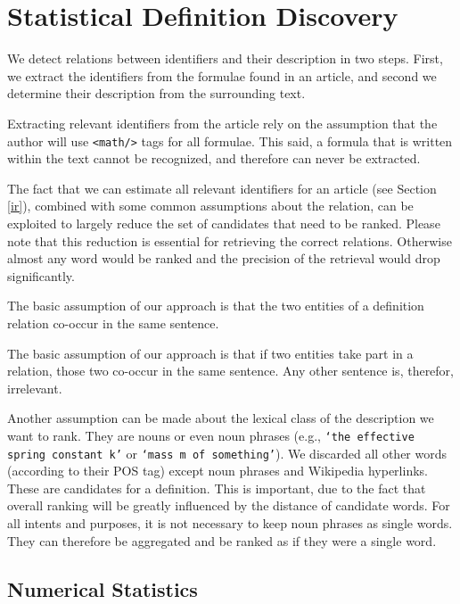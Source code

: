\documentclass[runningheads]{llncs}
\begin{document}
\section{Statistical Definition Discovery}

We detect relations between identifiers and their description in two steps.
First, we extract the identifiers from the formulae found in an article, and
second we determine their description from the surrounding text.

Extracting relevant identifiers from the article rely on the assumption that
the author will use \texttt{<math/>} tags for all formulae. This said, a
formula that is written within the text cannot be recognized, and therefore
can never be extracted.

The fact that we can estimate all relevant identifiers for an article (see
Section \ref{ir}), combined with some common assumptions about the relation,
can be exploited to largely reduce the set of candidates that need to be ranked.
Please note that this reduction is essential for retrieving the correct
relations. Otherwise almost any word would be ranked and the precision of the
retrieval would drop significantly.

The basic assumption of our approach is that the two entities of a definition
relation co-occur in the same sentence.

The basic assumption of our approach is that if two entities take part in a
relation, those two co-occur in the same sentence.
Any other sentence is, therefor, irrelevant.

Another assumption can be made about the lexical class
of the description we want to rank. They are nouns or even noun phrases 
(e.g.,
\texttt{`the effective spring constant k'} or \texttt{`mass m of
something'}). We discarded all other words (according to their POS tag)
except noun phrases and Wikipedia hyperlinks.  These are candidates for a 
definition.  This is important, due to the fact that overall
ranking will be greatly influenced by the distance of candidate words. For all
intents and purposes, it is not necessary to keep noun phrases as single words.
They can therefore be aggregated and be ranked as if they were a single word.


\subsection{Numerical Statistics}
\end{document}
